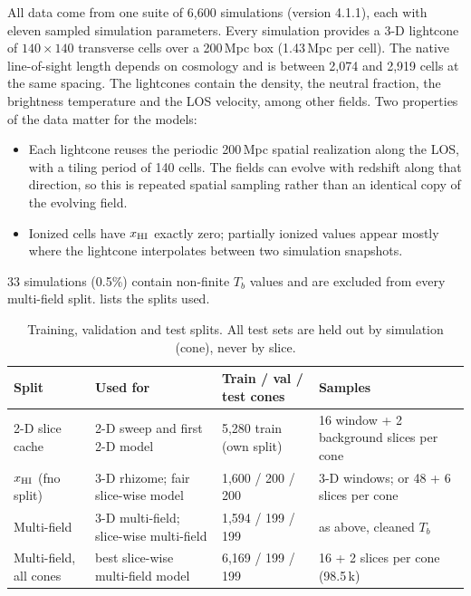 All data come from one suite of 6,600 \cmfast{} \citep{mesinger2011cmfast} simulations (version 4.1.1), each with eleven sampled simulation parameters. Every simulation provides a 3-D lightcone of $140\times140$ transverse cells over a 200\,Mpc box (1.43\,Mpc per cell). The native line-of-sight length depends on cosmology and is between 2,074 and 2,919 cells at the same spacing. The lightcones contain the density, the neutral fraction, the brightness temperature and the LOS velocity, among other fields. Two properties of the data matter for the models:
\begin{itemize}
  \item Each lightcone reuses the periodic 200\,Mpc spatial realization along the LOS, with a tiling period of 140 cells. The fields can evolve with redshift along that direction, so this is repeated spatial sampling rather than an identical copy of the evolving field.
  \item Ionized cells have $x_{\mathrm{HI}}$ exactly zero; partially ionized values appear mostly where the lightcone interpolates between two simulation snapshots.
\end{itemize}
33 simulations (0.5\%) contain non-finite $T_b$ values and are excluded from every multi-field split.  lists the splits used.

\begin{table}[!tp]
  \centering
  \caption{Training, validation and test splits. All test sets are held out by simulation (cone), never by slice.}
  \label{tab:datasets}
  \small
  \begin{tabular}{@{}p{2.9cm}p{4.3cm}p{2.6cm}p{4.2cm}@{}}
    \toprule
    Split & Used for & Train / val / test cones & Samples \\
    \midrule
    2-D slice cache & 2-D sweep and first 2-D model & 5,280 train (own split) & 16 window + 2 background slices per cone \\
    $x_{\mathrm{HI}}$ (fno split) & 3-D rhizome; fair slice-wise model & 1,600 / 200 / 200 & 3-D windows; or 48 + 6 slices per cone \\
    Multi-field & 3-D multi-field; slice-wise multi-field & 1,594 / 199 / 199 & as above, cleaned $T_b$ \\
    Multi-field, all cones & best slice-wise multi-field model & 6,169 / 199 / 199 & 16 + 2 slices per cone (98.5\,k) \\
    \bottomrule
  \end{tabular}
\end{table}

